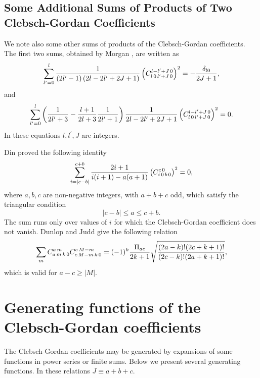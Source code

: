 \subsection{Some Additional Sums of Products of Two Clebsch-Gordan Coefficients}\label{sec:8.7.7}
We note also some other sums of products of the Clebsch-Gordan coefficients. The first two sums, obtained by Morgan \cite{ref136}, are written as
\begin{equation}
\sum_{l^{\prime}=0}^{l} \frac{1}{\left(2 l^{\prime}-1\right)\left(2 l-2 l^{\prime}+2 J+1\right)}\left(C_{l\,0\,l^{\prime}+J\,0}^{l-l^{\prime}+J\,0}\right)^{2}=-\frac{\delta_{l0}}{2 J+1}, \label{eq:8:7:44}
\end{equation}
and
\begin{equation}
\sum_{l^{\prime}=0}^{l}\left(\frac{1}{2 l^{\prime}+3}-\frac{l+1}{2 l+3} \frac{1}{2 l^{\prime}+1}\right) \frac{1}{2 l-2 l^\prime+2 J+1}
\left(
  C_{l\,0\,l^\prime+J\,0}^{l-l^\prime+J\,0}
\right)^{2}=0 . \label{eq:8:7:45}
\end{equation}
In these equations $l, l^{\prime}, J$ are integers.

Din proved the following identity \cite{ref134}
\begin{equation}
\sum_{i=|c-b|}^{c+b} \frac{2 i+1}{i(i+1)-a(a+1)}\left(C_{i\,0\,b\,0}^{c\,0}\right)^{2}=0, \label{eq:8:7:46}
\end{equation}
where $a, b, c$ are non-negative integers, with $a+b+c$ odd, which satisfy the triangular condition
\[
|c-b| \leq a \leq c+b .
\]
The sum runs only over values of $i$ for which the Clebsch-Gordan coefficient does not vanish. Dunlop and Judd \cite{ref135} give the following relation
\begin{equation}
\sum_{m} \clebsch{a}{m}{k}{0}{a}{m} \clebsch{c}{M-m}{k}{0}{c}{M-m}=(-1)^{k} \frac{\Fact{a c}}{2 k+1} \sqrt{\frac{(2 a-k)!(2 c+k+1)!}{(2 c-k)!(2 a+k+1)!}}, \label{eq:8:7:47}
\end{equation}
which is valid for $a-c \geq|M|$.

\section{Generating functions of the Clebsch-Gordan coefficients}\label{sec:8.8}
The Clebsch-Gordan coefficients may be generated by expansions of some functions in power series or finite sums. Below we present several generating functions. In these relations $J \equiv a+b+c$.

